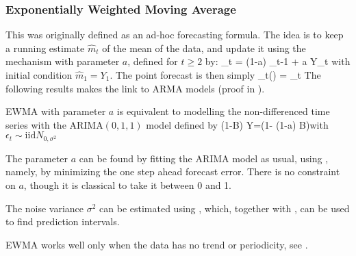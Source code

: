 \subsubsection{Exponentially Weighted Moving Average}
This was originally defined as an ad-hoc forecasting formula.
The idea is to keep a running estimate $\hat{m}_t$ of
the mean of the data, and update it using the  mechanism with parameter $a$, defined for $t
\geq 2 $ by:
 \be {}_{t} =
(1-a)  _{t-1} + a Y_t \label{eq-hw1}
 \ee
 with initial condition $\hat{m}_1=Y_1$. The point
 forecast is then simply
\be
 _t(\ell) =  _t
 \label{eq-ewma-1}
\ee The following results makes the link to ARMA models (proof
in ).
\begin{proposition} EWMA with parameter $a$ is
equivalent to modelling the non-differenced time
series with the ARIMA$(0,1,1)$ model defined by
 \be(1-B) Y=(1-
(1-a) B)\epsilon\ee with $\epsilon_t \sim \mbox{iid}
N_{0, \sigma^2}$\label{prop-hw1-arima}
\end{proposition}
The parameter $a$ can be found by fitting the ARIMA
model as usual, using , namely,
by minimizing the one step ahead forecast error. There
is no constraint on $a$, though it is classical to
take it between 0 and 1.

The noise variance $\sigma^2$ can be estimated using
, which, together with
, can be used to find
prediction intervals.

EWMA works well only when the data has no trend or
periodicity, see .


\begin{figure}[!htbp]
\begin{center}
\end{center}
\end{figure}

%

